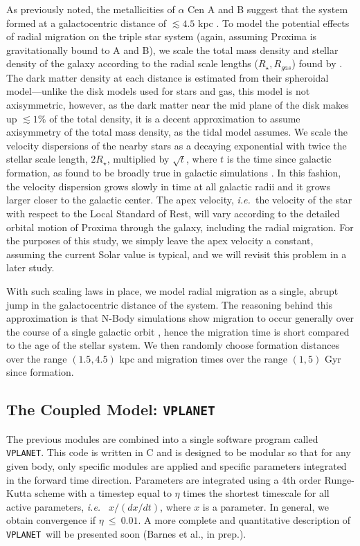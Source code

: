 \documentclass[preprint,12pt]{aastex}
\newcommand{\xxx}[1]{{\color{red} #1}} %
\def\ie{{\it i.e.\ }}
\def\vplanet{\texttt{\footnotesize{VPLANET}}\xspace}
\begin{document}
As previously noted, the metallicities of $\alpha$ Cen A and B 
suggest that the system formed at a galactocentric distance of 
$\lesssim 4.5$ kpc \citep{Loebman16}. To model the potential 
effects of radial migration on the triple star system (again, 
assuming Proxima is gravitationally bound to A and B), we 
scale the total mass density and stellar density of the galaxy 
according to the radial scale lengths ($R_{\star}, R_{gas}$) found
by \cite{Kordopatis15}. The dark matter density at each distance 
is estimated from their spheroidal model---unlike the disk models 
used for stars and gas, this model is not axisymmetric, however, 
as the dark matter near the mid plane of the disk makes up 
$\lesssim 1\%$ of the total density, it is a decent approximation 
to assume axisymmetry of the total mass density, as the 
\cite{Heisler1986} tidal model assumes. We scale the velocity 
dispersions of the nearby stars as a decaying exponential 
with twice the stellar scale length, $2R_{\star}$, multiplied by 
$\sqrt{t}$, where $t$ is the time since galactic formation, as found 
to be broadly true in galactic simulations 
\citep{Minchev2012, Roskar2012}. In this fashion, the velocity 
dispersion grows slowly in time at all galactic radii and it grows 
larger closer to the galactic center.
\xxx{
The apex velocity, \ie the velocity of the star with respect to
the Local Standard of Rest, will vary according to the detailed
orbital motion
of Proxima through the galaxy, including the radial migration.  For the
purposes of this study, we
simply leave the apex velocity a constant, assuming the current Solar
value is typical, and we will revisit this problem in a later study.}

With such scaling laws in place, we model radial migration 
as a single, abrupt jump in the galactocentric distance of the 
system. The reasoning behind this approximation is that N-Body 
simulations show migration to occur generally over the 
course of a single galactic orbit \cite{Roskar2010}, hence the 
migration time is short compared to the age of the stellar system.
We then randomly choose formation distances over the range 
$(1.5,4.5)$ kpc and migration times over the range $(1,5)$ Gyr 
since formation.

\subsection{The Coupled Model: \vplanet}
\label{sec:models:vplanet}
The previous modules are combined into a single software program
called \vplanet. This code is written in C and is designed to be
modular so that for any given body, only specific modules are applied
and specific parameters integrated in the forward time direction. 
Parameters are integrated
using a 4th order Runge-Kutta scheme with a timestep equal to $\eta$
times the shortest timescale for all active parameters, \ie
$x/(dx/dt)$, where $x$ is a parameter. In general, we obtain convergence if
$\eta~\le~0.01$. A more complete and quantitative description of
\vplanet~will be presented soon (Barnes et al., in prep.). 
\end{document}
